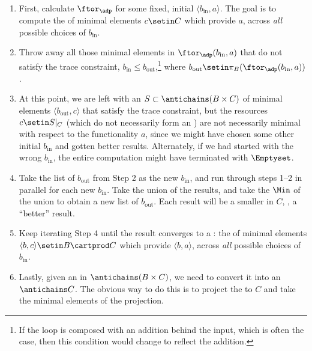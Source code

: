 \begin{enumerate}
    \item First, calculate $\ftor_\adp$ for some fixed, initial $\langle b_{\text{in}},a \rangle$.
          The goal is to compute the  of minimal elements $c \setin C$ which provide $a$, across \emph{all} possible choices of $b_{\text{in}}$.
    \item Throw away all those minimal elements in $\ftor_\adp(b_{\text{in}},a)$ that do not satisfy the trace constraint, $b_{\text{in}} \leq b_{\text{out}}$,\footnote{If the loop is composed with an addition behind the input, which is often the case, then this condition would change to reflect the addition.} where $b_{\text{out}} \setin \pi_B(\ftor_\adp(b_{\text{in}},a))$.
    \item At this point, we are left with an  $S \subset \antichains (B \times C)$ of minimal elements $\langle b_{\text{out}},c \rangle$ that satisfy the trace constraint, but the resources $c \setin S|_C$ (which do not necessarily form an ) are not necessarily minimal with respect to the functionality $a$, since we might have chosen some other initial $b_{\text{in}}$ and gotten better results.
          Alternately, if we had started with the wrong $b_{\text{in}}$, the entire computation might have terminated with $\Emptyset$.
    \item Take the list of $b_{\text{out}}$ from Step 2 as the new $b_{\text{in}}$, and run through steps 1--2 in parallel for each new $b_{\text{in}}$.
          Take the union of the results, and take the $\Min$ of the union to obtain a new list of $b_{\text{out}}$.
          Each result will be a smaller  in $C$, \ie, a ``better'' result.
    \item Keep iterating Step 4 until the result converges to a : the  of minimal elements $\langle b, c \rangle \setin B \cartprod C$ which provide $\langle b, a \rangle$, across \emph{all} possible choices of $b_{\text{in}}$.
    \item Lastly, given an  in $\antichains (B\times C)$, we need to convert it into an  $\antichains C$.
          The obvious way to do this is to project the  to $C$ and take the minimal elements of the projection.

\end{enumerate}
